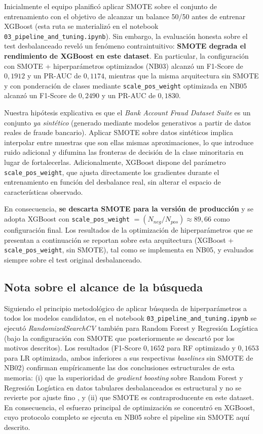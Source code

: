 \documentclass[12pt,a4paper]{report}
\begin{document}
Inicialmente el equipo planificó aplicar SMOTE sobre el conjunto de entrenamiento con el objetivo de alcanzar un balance 50/50 antes de entrenar XGBoost (esta ruta se materializó en el notebook \texttt{03\_pipeline\_and\_tuning.ipynb}). Sin embargo, la evaluación honesta sobre el test desbalanceado reveló un fenómeno contraintuitivo: \textbf{SMOTE degrada el rendimiento de XGBoost en este dataset}. En particular, la configuración con SMOTE + hiperparámetros optimizados (NB03) alcanzó un F1-Score de $0{,}1912$ y un PR-AUC de $0{,}1174$, mientras que la misma arquitectura sin SMOTE y con ponderación de clases mediante \texttt{scale\_pos\_weight} optimizada en NB05 alcanzó un F1-Score de $0{,}2490$ y un PR-AUC de $0{,}1830$.

Nuestra hipótesis explicativa es que el \textit{Bank Account Fraud Dataset Suite} \cite{jesus2022bank} es un conjunto \emph{ya sintético} (generado mediante modelos generativos a partir de datos reales de fraude bancario). Aplicar SMOTE sobre datos sintéticos implica interpolar entre muestras que son ellas mismas aproximaciones, lo que introduce ruido adicional y difumina las fronteras de decisión de la clase minoritaria en lugar de fortalecerlas. Adicionalmente, XGBoost dispone del parámetro \texttt{scale\_pos\_weight}, que ajusta directamente los gradientes durante el entrenamiento en función del desbalance real, sin alterar el espacio de características observado.

En consecuencia, \textbf{se descarta SMOTE para la versión de producción} y se adopta XGBoost con \texttt{scale\_pos\_weight} $= (N_{neg}/N_{pos}) \approx 89{,}66$ como configuración final. Los resultados de la optimización de hiperparámetros que se presentan a continuación se reportan sobre esta arquitectura (XGBoost + \texttt{scale\_pos\_weight}, sin SMOTE), tal como se implementa en NB05, y evaluados siempre sobre el test original desbalanceado.

\subsection*{Nota sobre el alcance de la búsqueda}

Siguiendo el principio metodológico de aplicar búsqueda de hiperparámetros a todos los modelos candidatos, en el notebook \texttt{03\_pipeline\_and\_tuning.ipynb} se ejecutó \textit{RandomizedSearchCV} también para Random Forest y Regresión Logística (bajo la configuración con SMOTE que posteriormente se descartó por los motivos descritos). Los resultados (F1-Score $0{,}1652$ para RF optimizado y $0{,}1653$ para LR optimizada, ambos inferiores a sus respectivas \textit{baselines} sin SMOTE de NB02) confirman empíricamente las dos conclusiones estructurales de esta memoria: (i) que la superioridad de \textit{gradient boosting} sobre Random Forest y Regresión Logística en datos tabulares desbalanceados es estructural y no se revierte por ajuste fino \cite{chen2016, das2023}, y (ii) que SMOTE es contraproducente en este dataset. En consecuencia, el esfuerzo principal de optimización se concentró en XGBoost, cuyo protocolo completo se ejecuta en NB05 sobre el pipeline sin SMOTE aquí descrito.
\end{document}

